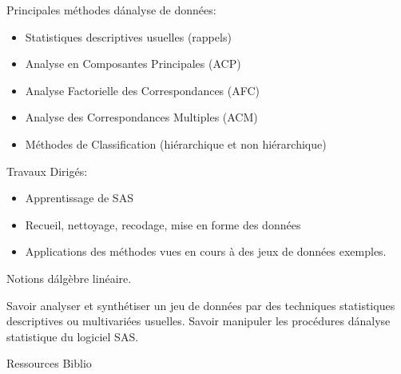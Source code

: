 



{
Principales méthodes d\'analyse de données:
\begin{itemize} 
\item Statistiques descriptives usuelles (rappels)
\item Analyse en Composantes Principales (ACP)
\item Analyse Factorielle des Correspondances (AFC)
\item Analyse des Correspondances Multiples (ACM)
\item Méthodes de Classification (hiérarchique et non hiérarchique)
\end{itemize} 
Travaux Dirigés:
\begin{itemize} 
\item Apprentissage de SAS
\item Recueil, nettoyage, recodage, mise en forme des données
\item Applications des méthodes vues en cours à des jeux de données exemples.
\end{itemize} 
} 
{Notions d\'algèbre linéaire.} 
{\begin{itemize} 
  \ObjItem Savoir analyser et synthétiser un jeu de données par des techniques
statistiques descriptives ou multivariées usuelles.
  \ObjItem Savoir manipuler les
procédures d\'analyse statistique du logiciel SAS.
\end{itemize} 
} 
{Ressources} 
{Biblio} 
 
\vfill

